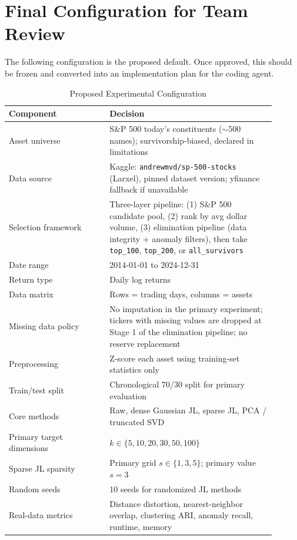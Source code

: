 \documentclass[11pt]{article}
\begin{document}
\section{Final Configuration for Team Review}

The following configuration is the proposed default. Once approved, this should be frozen and converted into an implementation plan for the coding agent.

\begin{table}[H]
\centering
\caption{Proposed Experimental Configuration}
\begin{tabular}{p{0.34\linewidth} p{0.56\linewidth}}
\toprule
\textbf{Component} & \textbf{Decision} \\
\midrule
Asset universe & S\&P 500 today's constituents ($\sim$500 names); survivorship-biased, declared in limitations \\
Data source & Kaggle: \texttt{andrewmvd/sp-500-stocks} (Larxel), pinned dataset version; yfinance fallback if unavailable \\
Selection framework & Three-layer pipeline: (1) S\&P 500 candidate pool, (2) rank by avg dollar volume, (3) elimination pipeline (data integrity + anomaly filters), then take \texttt{top\_100}, \texttt{top\_200}, or \texttt{all\_survivors} \\
Date range & 2014-01-01 to 2024-12-31 \\
Return type & Daily log returns \\
Data matrix & Rows = trading days, columns = assets \\
Missing data policy & No imputation in the primary experiment; tickers with missing values are dropped at Stage 1 of the elimination pipeline; no reserve replacement \\
Preprocessing & Z-score each asset using training-set statistics only \\
Train/test split & Chronological 70/30 split for primary evaluation \\
Core methods & Raw, dense Gaussian JL, sparse JL, PCA / truncated SVD \\
Primary target dimensions & $k \in \{5, 10, 20, 30, 50, 100\}$ \\
Sparse JL sparsity & Primary grid $s \in \{1, 3, 5\}$; primary value $s=3$ \\
Random seeds & 10 seeds for randomized JL methods \\
Real-data metrics & Distance distortion, nearest-neighbor overlap, clustering ARI, anomaly recall, runtime, memory \\

\end{tabular}
\end{table}
\end{document}
